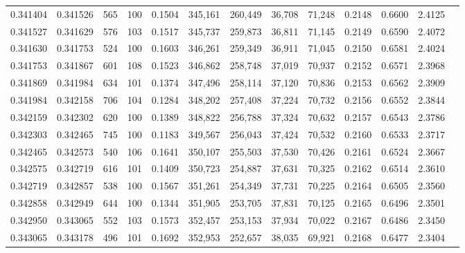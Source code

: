 \begin{tabular}{rrrrrrrrrrrrr}
0.341404 & 0.341526 &   565 & 100 &                                     0.1504 & 345,161 & 260,449 &  36,708 &  71,248 & 0.2148 & 0.6600 & 2.4125 \\
0.341527 & 0.341629 &   576 & 103 &                                     0.1517 & 345,737 & 259,873 &  36,811 &  71,145 & 0.2149 & 0.6590 & 2.4072 \\
0.341630 & 0.341753 &   524 & 100 &                                     0.1603 & 346,261 & 259,349 &  36,911 &  71,045 & 0.2150 & 0.6581 & 2.4024 \\
0.341753 & 0.341867 &   601 & 108 &                                     0.1523 & 346,862 & 258,748 &  37,019 &  70,937 & 0.2152 & 0.6571 & 2.3968 \\
0.341869 & 0.341984 &   634 & 101 &                                     0.1374 & 347,496 & 258,114 &  37,120 &  70,836 & 0.2153 & 0.6562 & 2.3909 \\
0.341984 & 0.342158 &   706 & 104 &                                     0.1284 & 348,202 & 257,408 &  37,224 &  70,732 & 0.2156 & 0.6552 & 2.3844 \\
0.342159 & 0.342302 &   620 & 100 &                                     0.1389 & 348,822 & 256,788 &  37,324 &  70,632 & 0.2157 & 0.6543 & 2.3786 \\
0.342303 & 0.342465 &   745 & 100 &                                     0.1183 & 349,567 & 256,043 &  37,424 &  70,532 & 0.2160 & 0.6533 & 2.3717 \\
0.342465 & 0.342573 &   540 & 106 &                                     0.1641 & 350,107 & 255,503 &  37,530 &  70,426 & 0.2161 & 0.6524 & 2.3667 \\
0.342575 & 0.342719 &   616 & 101 &                                     0.1409 & 350,723 & 254,887 &  37,631 &  70,325 & 0.2162 & 0.6514 & 2.3610 \\
0.342719 & 0.342857 &   538 & 100 &                                     0.1567 & 351,261 & 254,349 &  37,731 &  70,225 & 0.2164 & 0.6505 & 2.3560 \\
0.342858 & 0.342949 &   644 & 100 &                                     0.1344 & 351,905 & 253,705 &  37,831 &  70,125 & 0.2165 & 0.6496 & 2.3501 \\
0.342950 & 0.343065 &   552 & 103 &                                     0.1573 & 352,457 & 253,153 &  37,934 &  70,022 & 0.2167 & 0.6486 & 2.3450 \\
0.343065 & 0.343178 &   496 & 101 &                                     0.1692 & 352,953 & 252,657 &  38,035 &  69,921 & 0.2168 & 0.6477 & 2.3404 \\

\end{tabular}
